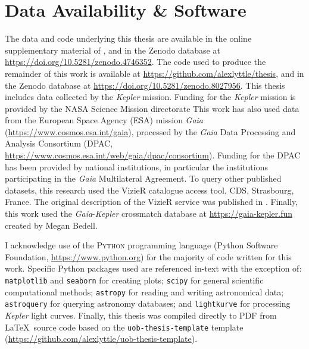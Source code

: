 \chapter*{Data Availability \& Software}

The data and code underlying this thesis are available in the online supplementary material of \citet{Lyttle.Davies.ea2021}, and in the Zenodo database at \url{https://doi.org/10.5281/zenodo.4746352}. The code used to produce the remainder of this work is available at \url{https://github.com/alexlyttle/thesis}, and in the Zenodo database at \url{https://doi.org/10.5281/zenodo.8027956}. This thesis includes data collected by the \emph{Kepler} mission. Funding for the \emph{Kepler} mission is provided by the NASA Science Mission directorate This work has also used data from the European Space Agency (ESA) mission
\emph{Gaia} (\url{https://www.cosmos.esa.int/gaia}), processed by the {\it Gaia}
Data Processing and Analysis Consortium (DPAC,
\url{https://www.cosmos.esa.int/web/gaia/dpac/consortium}). Funding for the DPAC
has been provided by national institutions, in particular the institutions
participating in the \emph{Gaia} Multilateral Agreement. To query other published datasets, this research used the VizieR catalogue access tool, CDS, Strasbourg, France. The original description of the VizieR service was published in \citet{Ochsenbein.Bauer.ea2000}. Finally, this work used the \emph{Gaia}-\emph{Kepler} crossmatch database at \url{https://gaia-kepler.fun} created by Megan Bedell.

I acknowledge use of the \textsc{Python} programming language (Python Software Foundation, \url{https://www.python.org}) for the majority of code written for this work. Specific Python packages used are referenced in-text with the exception of: \texttt{matplotlib} \citep[v3.6.2;][]{Caswell.Lee.ea2022,Hunter2007} and \texttt{seaborn} \citep{Waskom2021} for creating plots; \texttt{scipy} \citep{Virtanen.Gommers.ea2020} for general scientific computational methods; \texttt{astropy} \citep{AstropyCollaboration.Price-Whelan.ea2022} for reading and writing astronomical data; \texttt{astroquery} \citep{Ginsburg.Sipocz.ea2019} for querying astronomy databases; and \texttt{lightkurve} \citep{LightkurveCollaboration.Cardoso.ea2018} for processing \emph{Kepler} light curves. Finally, this thesis was compiled directly to PDF from \LaTeX~source code based on the \texttt{uob-thesis-template} template (\url{https://github.com/alexlyttle/uob-thesis-template}).
